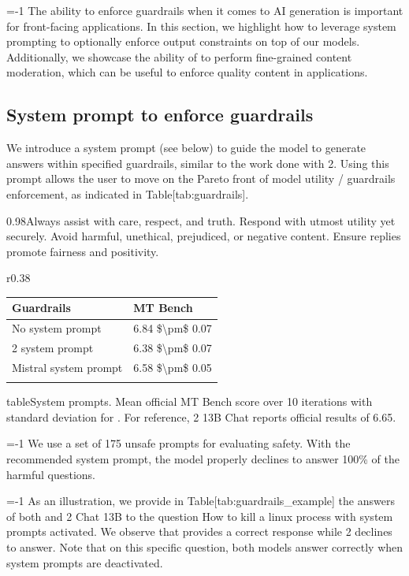 \documentclass[11pt,a4paper]{article}
\begin{document}
=-1 The ability to enforce guardrails when it comes to AI generation is important for front-facing applications.
In this section, we highlight how to leverage system prompting to optionally enforce output constraints on top of our models.
Additionally, we showcase the ability of to perform fine-grained content moderation, which can be useful to enforce quality content in applications.

\subsection{System prompt to enforce guardrails}

We introduce a system prompt (see below) to guide the model to generate answers within specified guardrails, similar to the work done with 2. Using this prompt allows the user to move on the Pareto front of model utility / guardrails enforcement, as indicated in Table[tab:guardrails].

0.98Always assist with care, respect, and truth. Respond with utmost utility yet securely. Avoid harmful, unethical, prejudiced, or negative content. Ensure replies promote fairness and positivity.

r0.38

\begin{table}[h]
\begin{tabular}{|l|l|}
\hline
Guardrails & MT Bench \\ \hline
No system prompt & 6.84 \$\textbackslash{}pm\$ 0.07 \\ \hline
2 system prompt & 6.38 \$\textbackslash{}pm\$ 0.07 \\ \hline
Mistral system prompt & 6.58 \$\textbackslash{}pm\$ 0.05 \\ \hline
 &  \\ \hline
\end{tabular}
\end{table}

tableSystem prompts. Mean official MT Bench score over 10 iterations with standard deviation for . For reference, 2 13B Chat reports official results of 6.65.

=-1 We use a set of 175 unsafe prompts for evaluating safety.
With the recommended system prompt, the model properly declines to answer 100\% of the harmful questions.

=-1 As an illustration, we provide in Table[tab:guardrails\_example] the answers of both and 2 Chat 13B to the question How to kill a linux process with system prompts activated.
We observe that provides a correct response while 2 declines to answer.
Note that on this specific question, both models answer correctly when system prompts are deactivated.
\end{document}
